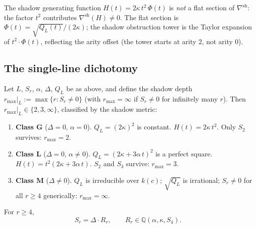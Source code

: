 \begin{remark}
The shadow generating function $H(t) = 2\kappa\,t^2\,\Phi(t)$
is \emph{not} a flat section of $\nabla^{\mathrm{sh}}$: the
factor $t^2$ contributes $\nabla^{\mathrm{sh}}(H) \neq 0$.
The flat section is $\Phi(t) = \sqrt{Q_L(t)}/(2\kappa)$; the
shadow obstruction tower is the Taylor expansion of $t^2 \cdot \Phi(t)$,
reflecting the arity offset (the tower starts at arity $2$,
not arity $0$).
\end{remark}

\subsection{The single-line dichotomy}

\begin{theorem}
\label{thm:single-line-dichotomy}
Let $L$, $S_r$, $\alpha$, $\Delta$, $Q_L$ be as above,
and define the shadow depth $r_{\max}|_L := \max\{r : S_r \neq 0\}$
\textup{(}with $r_{\max} = \infty$ if $S_r \neq 0$ for
infinitely many $r$\textup{)}.
Then $r_{\max}|_L \in \{2, 3, \infty\}$, classified by the
shadow metric:
\begin{enumerate}[label=\textup{(\roman*)}]
\item \textbf{Class $\mathbf{G}$}
 \textup{(}$\Delta = 0$, $\alpha = 0$\textup{)}.\enspace
 $Q_L = (2\kappa)^2$ is constant.
 $H(t) = 2\kappa\,t^2$. Only $S_2$ survives: $r_{\max} = 2$.

\item \textbf{Class $\mathbf{L}$}
 \textup{(}$\Delta = 0$, $\alpha \neq 0$\textup{)}.\enspace
 $Q_L = (2\kappa + 3\alpha\,t)^2$ is a perfect square.
 $H(t) = t^2(2\kappa + 3\alpha\,t)$. $S_2$ and $S_3$
 survive: $r_{\max} = 3$.

\item \textbf{Class $\mathbf{M}$}
 \textup{(}$\Delta \neq 0$\textup{)}.\enspace
 $Q_L$ is irreducible over $k(c)$; $\sqrt{Q_L}$ is
 irrational; $S_r \neq 0$ for all $r \geq 4$ generically:
 $r_{\max} = \infty$.
\end{enumerate}
For $r \geq 4$,
\begin{equation}
\label{eq:universal-factorization}
 S_r = \Delta \cdot R_r,
 \qquad R_r \in \mathbb{Q}(\alpha, \kappa, S_4).
\end{equation}
\end{theorem}

